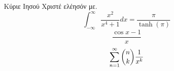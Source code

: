 \documentclass[a4paper,10pt]{book}
\begin{document}
Κύριε Ιησού Χριστέ ελέησόν με.
\[ \int_{-\infty}^{\infty}{\frac{x^2}{x^4+1}dx}=\frac{\pi}{\tanh{(\pi)}} \]
\[ \frac{\cos{x}-1}{x} \]
\[ \sum_{n=1}^{\infty}{\dbinom{n}{k}}{\frac{1}{x^k}} \]
\end{document}
